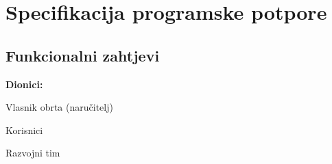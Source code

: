 \chapter{Specifikacija programske potpore}

    \section{Funkcionalni zahtjevi}

    \noindent \textbf{Dionici:}
		\begin{packed_enum}
			\item Vlasnik obrta (naručitelj)
			\item Korisnici				
            \item Razvojni tim
		\end{packed_enum}
			
